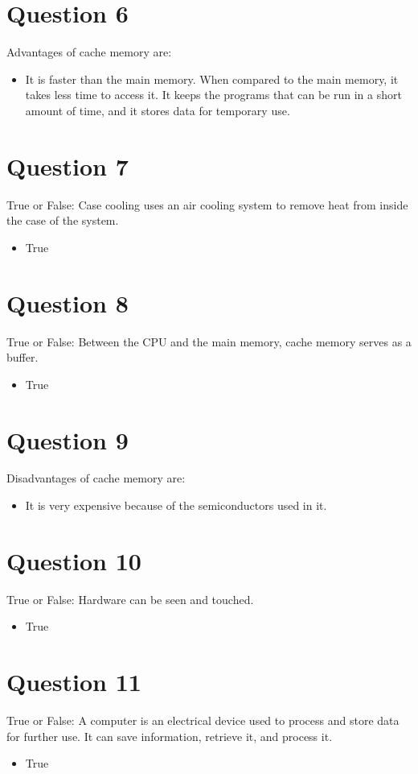 \documentclass{article}
\begin{document}
\section*{Question 6}
Advantages of cache memory are:
\begin{itemize}[label=\alph*.]
    \item It is faster than the main memory. When compared to the main memory, it takes less time to access it. It keeps the programs that can be run in a short amount of time, and it stores data for temporary use.
\end{itemize}

\section*{Question 7}
True or False: Case cooling uses an air cooling system to remove heat from inside the case of the system.
\begin{itemize}[label=\alph*.]
    \item True
\end{itemize}

\section*{Question 8}
True or False: Between the CPU and the main memory, cache memory serves as a buffer.
\begin{itemize}[label=\alph*.]
    \item True
\end{itemize}

\section*{Question 9}
Disadvantages of cache memory are:
\begin{itemize}[label=\alph*.]
    \item It is very expensive because of the semiconductors used in it.
\end{itemize}

\section*{Question 10}
True or False: Hardware can be seen and touched.
\begin{itemize}[label=\alph*.]
    \item True
\end{itemize}

\section*{Question 11}
True or False: A computer is an electrical device used to process and store data for further use. It can save information, retrieve it, and process it.
\begin{itemize}[label=\alph*.]
    \item True
\end{itemize}
\end{document}
